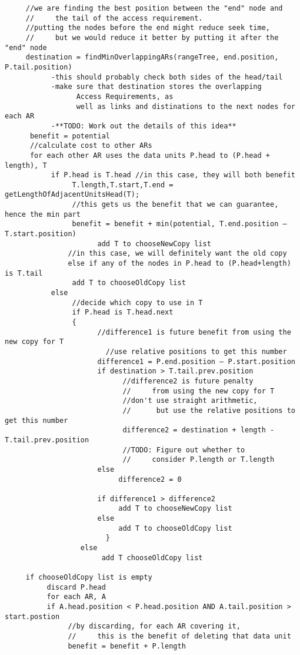 \documentclass[11pt,psfig]{article}
\begin{document}
\begin{verbatim}
     //we are finding the best position between the "end" node and 
     //     the tail of the access requirement.
     //putting the nodes before the end might reduce seek time, 
     //     but we would reduce it better by putting it after the "end" node
     destination = findMinOverlappingARs(rangeTree, end.position, P.tail.position)
           -this should probably check both sides of the head/tail
           -make sure that destination stores the overlapping 
                 Access Requirements, as
                 well as links and distinations to the next nodes for each AR
           -**TODO: Work out the details of this idea**
      benefit = potential
      //calculate cost to other ARs
      for each other AR uses the data units P.head to (P.head + length), T
           if P.head is T.head //in this case, they will both benefit
                T.length,T.start,T.end = getLengthOfAdjacentUnitsHead(T);
                //this gets us the benefit that we can guarantee, hence the min part
                benefit = benefit + min(potential, T.end.position – T.start.position)
			          add T to chooseNewCopy list
		       //in this case, we will definitely want the old copy
		       else if any of the nodes in P.head to (P.head+length) is T.tail
                add T to chooseOldCopy list
           else
                //decide which copy to use in T
                if P.head is T.head.next
                {
                      //difference1 is future benefit from using the new copy for T
	                    //use relative positions to get this number
                      difference1 = P.end.position – P.start.position
                      if destination > T.tail.prev.position
                            //difference2 is future penalty 
                            //     from using the new copy for T
                            //don't use straight arithmetic, 
                            //      but use the relative positions to get this number
                            difference2 = destination + length - T.tail.prev.position
                            //TODO: Figure out whether to 
                            //     consider P.length or T.length
                      else
                           difference2 = 0
				
                      if difference1 > difference2
                           add T to chooseNewCopy list
                      else
                           add T to chooseOldCopy list
			            }
                  else
                       add T chooseOldCopy list
			
     if chooseOldCopy list is empty
          discard P.head
          for each AR, A
          if A.head.position < P.head.position AND A.tail.position > start.postion
               //by discarding, for each AR covering it, 
               //     this is the benefit of deleting that data unit
               benefit = benefit + P.length

\end{verbatim}
\end{document}
